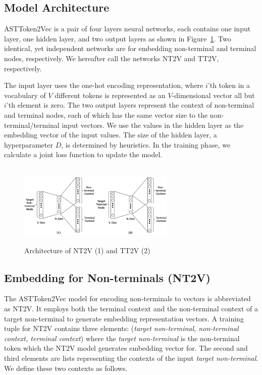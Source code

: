 \documentclass[E]{compsoft}
\begin{document}
\subsection{Model Architecture}
ASTToken2Vec is a pair of four layers neural networks, each contains one input layer, one hidden layer, and two output layers as shown in Figure~\ref{fig:node2vec-structure}.  Two identical, yet independent networks are for embedding non-terminal and terminal nodes, respectively.  We hereafter call the networks NT2V and TT2V, respectively.

The input layer uses the one-hot encoding representation, where $i$'th token in a vocabulary of $V$ different tokens is represented as an $V$-dimensional vector all but $i$'th element is zero.  
The two output layers represent the context of non-terminal and terminal nodes, each of which has the same vector size to the non-terminal/terminal input vectors.
We use the values in the hidden layer as the embedding vector of the input values.  The size of the hidden layer, a hyperparameter $D$, is determined by heuristics.
In the training phase, we calculate a joint loss function to update the model.


\begin{figure}[!ht]
\centering
\includegraphics[width=7.5cm, height=4cm]{pictures/node2vec_structure.png}
\caption{Architecture of NT2V (1) and TT2V (2)}
\label{fig:node2vec-structure}
\end{figure}


\subsection{Embedding for Non-terminals (NT2V)}
\label{sub:embedding_nt}
The ASTToken2Vec model for encoding non-terminals to vectors is abbreviated as NT2V. 
It employs both the terminal context and the non-terminal context of a target non-terminal to generate embedding representation vectors.
A training tuple for NT2V contains three elements: (\textit{target non-terminal, non-terminal context, terminal context}) where the \textit{target non-terminal} is the non-terminal token which the NT2V model generates embedding vector for. 
The second and third elements are lists representing the contexts of the input \textit{target non-terminal}.
We define these two contexts as follows.
\end{document}
